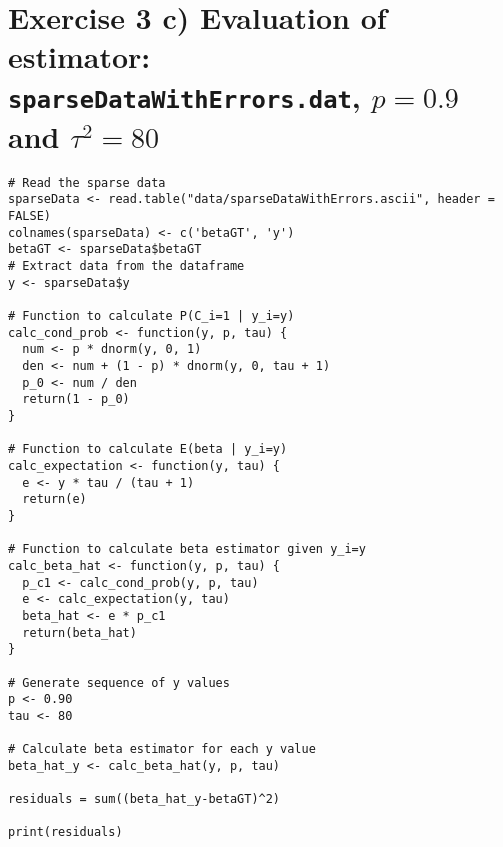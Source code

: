 \section*{Exercise 3 c) Evaluation of estimator: \texttt{sparseDataWithErrors.dat}, $p=0.9$ and $\tau^2 = 80$}
\begin{tcolorbox}[colback=white!95!black,colframe=white!50!black, breakable]
\begin{lstlisting}[caption={Exercise 3c}, label={lst:residual}]
# Read the sparse data
sparseData <- read.table("data/sparseDataWithErrors.ascii", header = FALSE)
colnames(sparseData) <- c('betaGT', 'y')
betaGT <- sparseData$betaGT
# Extract data from the dataframe
y <- sparseData$y

# Function to calculate P(C_i=1 | y_i=y)
calc_cond_prob <- function(y, p, tau) {
  num <- p * dnorm(y, 0, 1)
  den <- num + (1 - p) * dnorm(y, 0, tau + 1)
  p_0 <- num / den
  return(1 - p_0)
}

# Function to calculate E(beta | y_i=y)
calc_expectation <- function(y, tau) {
  e <- y * tau / (tau + 1)
  return(e)
}

# Function to calculate beta estimator given y_i=y
calc_beta_hat <- function(y, p, tau) {
  p_c1 <- calc_cond_prob(y, p, tau)
  e <- calc_expectation(y, tau)
  beta_hat <- e * p_c1
  return(beta_hat)
}

# Generate sequence of y values
p <- 0.90
tau <- 80

# Calculate beta estimator for each y value
beta_hat_y <- calc_beta_hat(y, p, tau)

residuals = sum((beta_hat_y-betaGT)^2)

print(residuals)
\end{lstlisting}
\end{tcolorbox}
\vspace{10mm}
